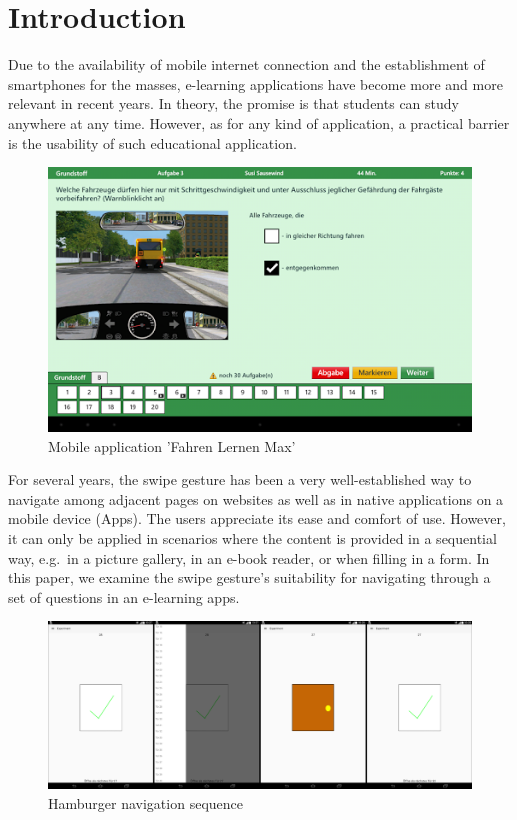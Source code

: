 \documentclass{sig-alternate-05-2015}
\begin{document}
\section{Introduction}
Due to the availability of mobile internet connection and the establishment of
smartphones for the masses, e-learning applications have become more and more relevant in recent years.  In theory, the promise is that students can study anywhere at any time. However, as for any kind of application, a practical barrier is the usability of such educational application.
\begin{figure}[h]
	\includegraphics[width=\columnwidth]{drivinglicense.png}
	\caption{Mobile application 'Fahren Lernen Max'}
	\label{fig:fahren_lernen}
\end{figure}
For several years, the swipe gesture has been a very well-established way to
navigate among adjacent pages on websites as well as in native applications on a mobile device (Apps). The users appreciate its ease and comfort of use. However,
it can only be applied in scenarios where the content is provided in a
sequential way, e.g.\ in a picture gallery, in an e-book reader, or when
filling in a form. In this paper, we examine the swipe gesture's suitability
for navigating through a set of questions in an e-learning apps.
\begin{figure}[!h]
	\centering
	\includegraphics[width=\linewidth]{pics/screenshots/sequence}
	\caption{Hamburger navigation sequence}
	\label{fig:sequence}
\end{figure}
\end{document}
